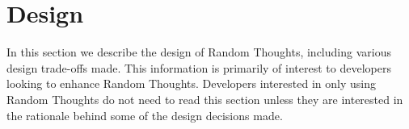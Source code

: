 
\chapter{Design}
\label{chapt:design}

In this section we describe the design of Random Thoughts, including various design trade-offs
made. This information is primarily of interest to developers looking to enhance Random
Thoughts. Developers interested in only using Random Thoughts do not need to read this section
unless they are interested in the rationale behind some of the design decisions made.

